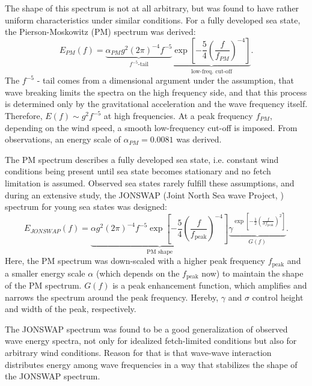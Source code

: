 The shape of this spectrum is not at all arbitrary, but was found to have 
rather uniform characteristics under similar conditions. For a fully 
developed sea state, the Pierson-Moskowitz (PM) spectrum was derived: 
\begin{equation}
 \label{PMspectrum}
 E_{PM}(f) = \underbrace{\alpha_{PM}g^2(2 
\pi)^{-4}f^{-5}}_{f^{-5}\text{-tail}} \underbrace{\exp \left[ - \frac{5}{4} 
\left( \frac{f}{f_{PM}} \right)^{-4} \right]}_{\text{low-freq. cut-off}}.
\end{equation}
The $f^{-5}$ - tail comes from a dimensional argument under the assumption, 
that wave breaking limits the spectra on the high frequency side, and that this 
process is determined only by the gravitational acceleration and the wave 
frequency itself. Therefore, $E(f) \sim g^2f^{-5}$ at high frequencies. At a 
peak frequency $f_{PM}$, depending on the wind speed, a smooth low-frequency 
cut-off is imposed. From observations, an energy scale of $\alpha_{PM} = 
0.0081$ was derived.

The PM spectrum describes a fully developed sea state, i.e. 
constant wind conditions being present until sea state becomes stationary and 
no fetch limitation is assumed. Observed sea states rarely fulfill these 
assumptions, and during an extensive study, the JONSWAP (Joint North Sea wave 
Project, \cite{hasselmann1974}) spectrum for young sea states was designed:
\begin{equation}
 \label{JONSWAPspectrum}
 E_{JONSWAP}(f) = \underbrace{\alpha g^2(2 
\pi)^{-4}f^{-5} \exp \left[ - \frac{5}{4} \left( \frac{f}{f_{\text{peak}}} 
\right)^{-4} \right]}_{\text{PM shape}} \underbrace{\gamma^{\exp \left[ - 
\frac{1}{2} \left( \frac{f}{\sigma f_{\text{peak}}} \right)^2 \right]}}_{G(f)}.
\end{equation}
Here, the PM spectrum was down-scaled with a higher peak frequency 
$f_\text{peak}$ and a smaller energy scale $\alpha$ (which depends on the 
$f_\text{peak}$ now) to maintain the shape of the PM spectrum. $G(f)$ is a peak 
enhancement function, which amplifies and narrows the spectrum around the peak 
frequency. Hereby, $\gamma$ and $\sigma$ control height and width of the peak, 
respectively. 

The JONSWAP spectrum was found to be a good generalization of observed wave 
energy spectra, not only for idealized fetch-limited conditions but also for 
arbitrary wind conditions. Reason for that is that wave-wave interaction 
distributes energy among wave frequencies in a way that stabilizes the shape of 
the JONSWAP spectrum. 

